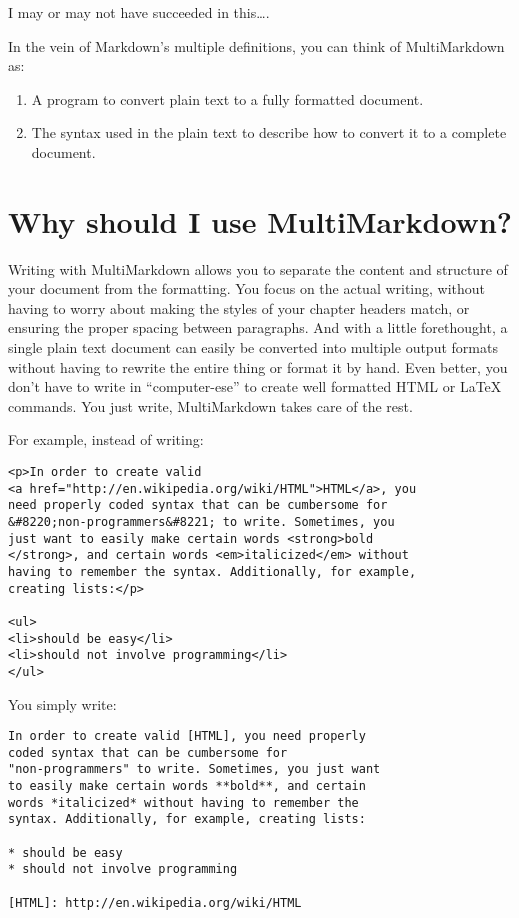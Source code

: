 I may or may not have succeeded in this{\ldots}.

In the vein of Markdown's multiple definitions, you can think of MultiMarkdown as:

\begin{enumerate}
\item A program to convert plain text to a fully formatted document.

\item The syntax used in the plain text to describe how to convert it to a complete document.

\end{enumerate}

\section{Why should I use MultiMarkdown?}
\label{whyshouldiusemultimarkdown}

Writing with MultiMarkdown allows you to separate the content and structure of your document from the formatting. You focus on the actual writing, without having to worry about making the styles of your chapter headers match, or ensuring the proper spacing between paragraphs. And with a little forethought, a single plain text document can easily be converted into multiple output formats without having to rewrite the entire thing or format it by hand. Even better, you don't have to write in ``computer-ese'' to create well formatted HTML or LaTeX commands. You just write, MultiMarkdown takes care of the rest.

For example, instead of writing:

\begin{verbatim}
<p>In order to create valid 
<a href="http://en.wikipedia.org/wiki/HTML">HTML</a>, you 
need properly coded syntax that can be cumbersome for 
&#8220;non-programmers&#8221; to write. Sometimes, you
just want to easily make certain words <strong>bold
</strong>, and certain words <em>italicized</em> without
having to remember the syntax. Additionally, for example,
creating lists:</p>

<ul>
<li>should be easy</li>
<li>should not involve programming</li>
</ul>
\end{verbatim}

You simply write:

\begin{verbatim}
In order to create valid [HTML], you need properly
coded syntax that can be cumbersome for 
"non-programmers" to write. Sometimes, you just want
to easily make certain words **bold**, and certain 
words *italicized* without having to remember the 
syntax. Additionally, for example, creating lists:

* should be easy
* should not involve programming

[HTML]: http://en.wikipedia.org/wiki/HTML
\end{verbatim}

